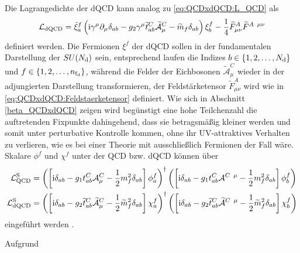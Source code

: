     Die Lagrangedichte der dQCD kann analog zu \eqref{eq:QCDxdQCD:L_QCD} als
    \begin{equation}
     \mathcal{L}_\text{dQCD} = \bar{\xi}_a^f \left( 
     \text{i} \gamma^\mu \partial_\mu \delta_{ab} 
     -g_2 \gamma^\mu \widetilde{t}^C_{ab} \widetilde{\mathcal{A}}_\mu^C
     -\widetilde{m}_f \delta_{ab}
     \right)\xi_b^f -\frac{1}{4} \widetilde{F}_{\mu \nu}^A 
     \widetilde{F}^{A \,\,\, \mu\nu}
     \label{eq:QCDxdQCD:L_dQCD}
    \end{equation}
    definiert werden. Die Fermionen $\xi^f$ der dQCD sollen in der fundamentalen 
    Darstellung der $SU(N_\text{d})$ sein, entsprechend laufen die Indizes 
    $b\in\{1,2,\ldots,N_\text{d}\}$ und $f\in\{ 1,2,\ldots,n_{\text{f}_\text{d}} \}$, während die 
    Felder der Eichbosonen $\widetilde{\mathcal{A}}^C_\mu$ wieder in der 
    adjungierten Darstellung transformieren, der Feldstärketensor 
    $\widetilde{F}^A_{\mu \nu}$ wird wie in 
    \eqref{eq:QCDxdQCD:Feldstaerketensor} definiert. Wie sich in Abschnitt 
    \ref{beta_QCDxdQCD} zeigen wird begünstigt eine hohe Teilchenzahl 
    die auftretenden Fixpunkte dahingehend, dass sie betragsmäßig kleiner 
    werden und somit unter perturbative Kontrolle kommen, ohne ihr 
    UV-attraktives Verhalten zu verlieren, wie es bei einer Theorie mit 
    ausschließlich Fermionen der Fall wäre. Skalare $\phi^f$ und $\chi^f$ 
    unter der QCD bzw. dQCD können über 
    \begin{align}
     \mathcal{L}_\text{QCD}^\text{S} &=
     \left( \left[ \text{i} \delta_{ab}- 
     g_1 t^C_{ab} \mathcal{A}^C_\mu -\frac{1}{2}m_f^2 \delta_{ab}
     \right] \phi^f_a \right)^\dagger
     \left( \left[ \text{i} \delta_{ab}- 
     g_1 t^C_{ab} \mathcal{A}^{C\,\,\, \mu} -\frac{1}{2}m_f^2 \delta_{ab}
     \right] \phi^f_b \right) \\
     \mathcal{L}_\text{dQCD}^\text{S} &=
     \left( \left[ \text{i} \delta_{ab}- 
     g_2 \widetilde{t}^C_{ab} \widetilde{\mathcal{A}}^C_\mu -\frac{1}{2}
     \widetilde{m}_f^2 \delta_{ab}
     \right] \chi^f_a \right)^\dagger
     \left( \left[ \text{i} \delta_{ab}- 
     g_2 \widetilde{t}^C_{ab} \widetilde{\mathcal{A}}^{C\,\,\, \mu} -
     \frac{1}{2}\widetilde{m}_f^2 \delta_{ab}
     \right] \chi^f_b \right)
    \end{align}
    eingeführt werden \cite{Scalar_QCD}. 

    
  
  
  
  Aufgrund\cite{Ade:2015xua}